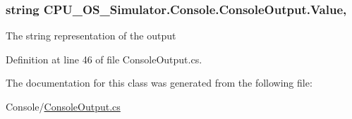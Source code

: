 \subsubsection[{Value}]{\setlength{\rightskip}{0pt plus 5cm}string C\+P\+U\+\_\+\+O\+S\+\_\+\+Simulator.\+Console.\+Console\+Output.\+Value\hspace{0.3cm}{\ttfamily [get]}, {\ttfamily [set]}}\label{class_c_p_u___o_s___simulator_1_1_console_1_1_console_output_a1a5c833114630e4739546948e8622cbd}


The string representation of the output 



Definition at line 46 of file Console\+Output.\+cs.



The documentation for this class was generated from the following file\+:\begin{DoxyCompactItemize}
\item 
Console/\hyperlink{_console_output_8cs}{Console\+Output.\+cs}\end{DoxyCompactItemize}

